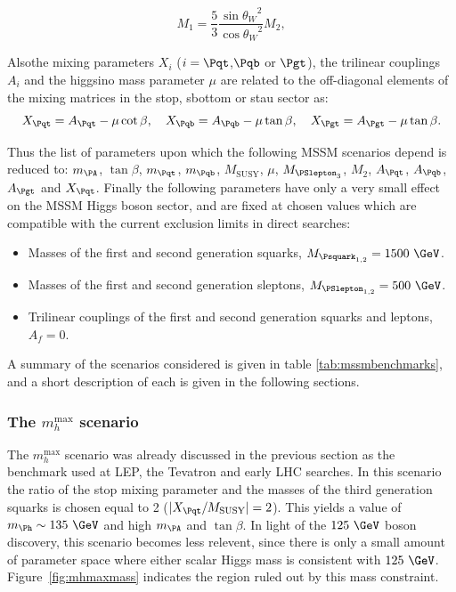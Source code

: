 \begin{equation}
M_{1} = \frac{5}{3}\frac{{\sin{\theta_{W}}}^{2}}{{\cos{\theta_{W}}}^{2}} M_{2},
\label{eq:GUTrelation}
\end{equation}

Alsothe mixing parameters $X_{i}$ ($i=\Pqt$,$\Pqb$ or
$\Pgt$), the trilinear couplings $A_{i}$ and the higgsino mass parameter $\mu$ 
are related to the off-diagonal elements of the mixing matrices in the
stop, sbottom or stau sector as:
\begin{equation}
X_{\Pqt} = A_{\Pqt} -\mu\cot\beta, \quad X_{\Pqb} = A_{\Pqb} -\mu\tan\beta,
\quad X_{\Pgt} = A_{\Pgt} -\mu\tan\beta .
\end{equation}

Thus the list of parameters upon which the following \ac{MSSM} scenarios depend is
reduced to: $m_{\PA}$, $\tan\beta$, $m_{\Pqt}$, $m_{\Pqb}$, $M_{\text{SUSY}}$,
$\mu$, $M_{\PSlepton_{3}}$, $M_{2}$, $A_{\Pqt}$, $A_{\Pqb}$, $A_{\Pgt}$ and
$X_{\Pqt}$. Finally the following parameters have only a very small effect on
the MSSM Higgs boson sector, and are fixed at chosen values which are compatible
with the current exclusion limits in direct searches:

\begin{itemize}
\item Masses of the first and second generation squarks, $M_{\Psquark_{1,2}} =
1500~\GeV$.
\item Masses of the first and second generation sleptons,  $M_{\PSlepton_{1,2}}
= 500~\GeV$.
\item Trilinear couplings of the first and second generation squarks and
leptons, $A_{f} = 0$.
\end{itemize}

A summary of the scenarios considered is given in table
\ref{tab:mssmbenchmarks}, and a short description of each is given in the
following sections.

\subsubsection{The $m_{h}^{\text{max}}$ scenario}
\label{sec:mhmaxscenario}

The $m_{h}^{\text{max}}$ scenario was already discussed in the previous section
as the benchmark used at LEP, the Tevatron and early LHC searches. 
In this scenario the ratio of the stop mixing parameter and the
masses of the third generation squarks is chosen equal to 2
($|X_{\Pqt}/M_{\text{SUSY}}| = 2$). This yields a value of
$m_{\Ph}\sim135~\GeV$ and high $m_{\PA}$ and $\tan\beta$. 
In light of the $125~\GeV$ boson discovery, this scenario becomes less relevent,
since there is only a small amount of parameter space where either scalar
Higgs mass is consistent with $125~\GeV$. Figure~\ref{fig:mhmaxmass} indicates
the region ruled out by this mass constraint. 

